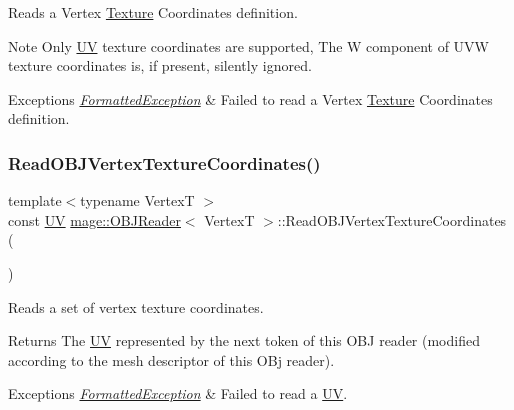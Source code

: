 Reads a Vertex \hyperlink{classmage_1_1_texture}{Texture} Coordinates definition.

\begin{DoxyNote}{Note}
Only \hyperlink{structmage_1_1_u_v}{UV} texture coordinates are supported, The W component of U\+VW texture coordinates is, if present, silently ignored. 
\end{DoxyNote}

\begin{DoxyExceptions}{Exceptions}
{\em \hyperlink{classmage_1_1_formatted_exception}{Formatted\+Exception}} & Failed to read a Vertex \hyperlink{classmage_1_1_texture}{Texture} Coordinates definition. \\
\hline
\end{DoxyExceptions}
\hypertarget{classmage_1_1_o_b_j_reader_a9b1a38d60a9d1c5c9095394fa37375e6}{}\label{classmage_1_1_o_b_j_reader_a9b1a38d60a9d1c5c9095394fa37375e6} 
\subsubsection{\texorpdfstring{Read\+O\+B\+J\+Vertex\+Texture\+Coordinates()}{ReadOBJVertexTextureCoordinates()}}
{\footnotesize\ttfamily template$<$typename VertexT $>$ \\
const \hyperlink{structmage_1_1_u_v}{UV} \hyperlink{classmage_1_1_o_b_j_reader}{mage\+::\+O\+B\+J\+Reader}$<$ VertexT $>$\+::Read\+O\+B\+J\+Vertex\+Texture\+Coordinates (\begin{DoxyParamCaption}{ }\end{DoxyParamCaption})\hspace{0.3cm}{\ttfamily [private]}}

Reads a set of vertex texture coordinates.

\begin{DoxyReturn}{Returns}
The {\ttfamily \hyperlink{structmage_1_1_u_v}{UV}} represented by the next token of this O\+BJ reader (modified according to the mesh descriptor of this O\+Bj reader). 
\end{DoxyReturn}

\begin{DoxyExceptions}{Exceptions}
{\em \hyperlink{classmage_1_1_formatted_exception}{Formatted\+Exception}} & Failed to read a {\ttfamily \hyperlink{structmage_1_1_u_v}{UV}}. \\
\hline
\end{DoxyExceptions}


